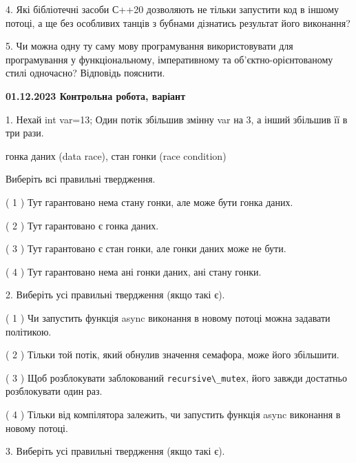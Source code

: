 \documentclass[12pt, ukrainian]{article}
\def\code#1{\Verb!#1!}
\begin{document}
\begin {large}
{\vspace{5mm}
4. Які бібліотечні засоби С++20 дозволяють не тільки запустити код в іншому потоці, а ще без особливих танців з бубнами дізнатись результат його виконання?



\vspace{5mm}
5. Чи можна одну ту саму мову програмування використовувати для програмування у функціональному, імперативному та об’єктно-орієнтованому стилі одночасно? Відповідь пояснити.
}
\end {large}

\vspace{4mm}
\newpage
\begin {large}

\textbf{01.12.2023 Контрольна робота, варіант  }\par


{
1. Нехай int var=13; Один потік збільшив змінну var на 3, а інший збільшив її в три рази.

гонка даних (data race), стан гонки (race condition)

Виберіть всі правильні твердження.\par
\vspace{2mm}
( 1 ) Тут гарантовано нема стану гонки, але може бути гонка даних.%

( 2 ) Тут гарантовано є гонка даних.%

( 3 ) Тут гарантовано є стан гонки, але гонки даних може не бути.%

( 4 ) Тут гарантовано нема ані гонки даних, ані стану гонки.%


\vspace{5mm}
2. Виберіть усі правильні твердження (якщо такі є).\par
\vspace{2mm}

( 1 ) Чи запустить функція  async виконання в новому потоці можна задавати політикою.%

( 2 ) Тільки той потік, який обнулив значення семафора, може його збільшити.%

( 3 ) Щоб розблокувати заблокований \code{recursive\_mutex}, його завжди достатньо розблокувати один раз.%

( 4 ) Тільки від компілятора залежить, чи запустить функція async виконання в новому потоці.%


\vspace{5mm}
3. Виберіть усі правильні твердження (якщо такі є).\par
\vspace{2mm}

}
\end{large}
\end{document}
